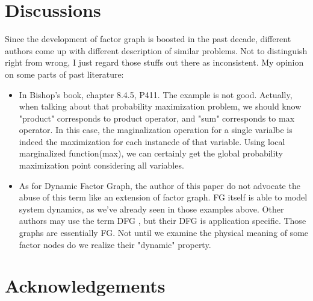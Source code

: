 \documentclass[11pt,a4paper]{article}
\begin{document}
\section{Discussions}

Since the development of factor graph is boosted in the past decade, 
different authors come up with different description of similar problems. 
Not to distinguish right from wrong, I just regard those stuffs out there
as inconsistent. My opinion on some parts of past literature:
\begin{itemize}
	\item In Bishop's book\cite{bishop2006pattern}, chapter 8.4.5, P411. 
	The example is not good. Actually, when talking about that probability 
	maximization problem, we should know "product" corresponds to product operator, 
	and "sum" corresponds to max operator. In this case, the maginalization 
	operation for a single varialbe is indeed the maximization for each 
	instancde of that variable. Using local marginalized function(max), we 
	can certainly get the global probability maximization point considering
	all variables. 
	\item As for Dynamic Factor Graph, the author of this paper do not advocate 
	the abuse of this term like an extension of factor graph. FG itself is able 
	to model system dynamics, as we've already seen in those examples above. 
	Other authors may use the term DFG
\cite{wang2011-dynamic}
\cite{mirowski2009dynamic}
	, but their DFG is application specific. 
	Those graphs are essentially FG. Not until we examine the physical meaning of 
	some factor nodes do we realize their "dynamic" property. 
\end{itemize}

\section*{Acknowledgements}


\end{document}
